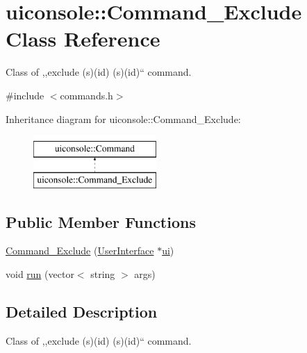 \hypertarget{classuiconsole_1_1Command__Exclude}{
\section{uiconsole::Command\_\-Exclude Class Reference}
\label{d8/d1d/classuiconsole_1_1Command__Exclude}
}


Class of ,,exclude (s)(id) (s)(id)`` command.  




{\ttfamily \#include $<$commands.h$>$}

Inheritance diagram for uiconsole::Command\_\-Exclude:\begin{figure}[H]
\begin{center}
\leavevmode
\includegraphics[height=2.000000cm]{d8/d1d/classuiconsole_1_1Command__Exclude}
\end{center}
\end{figure}
\subsection*{Public Member Functions}
\begin{DoxyCompactItemize}
\item 
\hyperlink{classuiconsole_1_1Command__Exclude_a6c01d50d0cfebf5c17ac8b40ce67fd49}{Command\_\-Exclude} (\hyperlink{classUserInterface}{UserInterface} $\ast$\hyperlink{classuiconsole_1_1Command_ab43ed5152860c099f858d62f9f556699}{ui})
\item 
void \hyperlink{classuiconsole_1_1Command__Exclude_ab2a21ebe3eaf318d9abbbdb89c6fe035}{run} (vector$<$ string $>$ args)
\end{DoxyCompactItemize}


\subsection{Detailed Description}
Class of ,,exclude (s)(id) (s)(id)`` command. 

